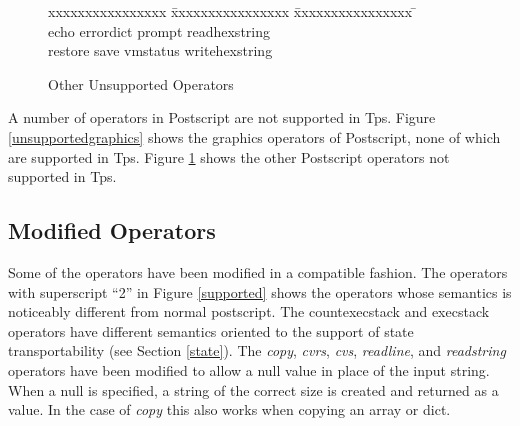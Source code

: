 \begin{figure}[b]\centering
\begin{tabbing}
xxxxxxxxxxxxxxxx \= xxxxxxxxxxxxxxxx \= xxxxxxxxxxxxxxxx \= \kill \\
echo \> errordict \> prompt \> readhexstring \\
restore \> save \> vmstatus \> writehexstring
\end{tabbing}
\caption{Other Unsupported Operators}
\label{otherunsupported}
\end{figure}
A number of operators in Postscript are not supported in Tps.
Figure \ref{unsupportedgraphics} shows the graphics operators of
Postscript, none of which are supported in Tps.
Figure \ref{otherunsupported} shows the other Postscript operators
not supported in Tps.

\subsection{Modified Operators}
Some of the operators have been modified in a compatible fashion.
The operators with superscript ``2'' in
Figure \ref{supported} shows the operators whose semantics
is noticeably different from normal postscript.
The countexecstack and execstack operators
have different semantics oriented to the support of state
transportability (see Section \ref{state}).
The {\em copy}, {\em cvrs}, {\em cvs}, {\em readline}, and {\em readstring}
operators
have been modified to allow a null value in place of the input string.
When a null is specified, a string of the correct size is created and returned
as a value.
In the case of {\em copy} this also works when copying an array or dict.

